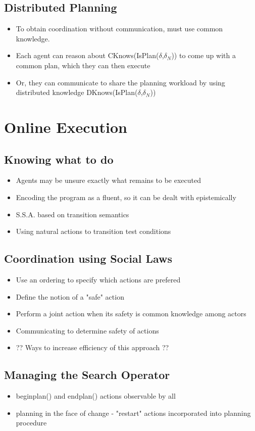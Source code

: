 \section{Distributed Planning}
\begin{itemize}
\item To obtain coordination without communication, must use common knowledge.
\item Each agent can reason about CKnows(IsPlan($\delta$,$\delta_N$)) to come up with a common plan, which they can then execute
\item Or, they can communicate to share the planning workload by using distributed knowledge DKnows(IsPlan($\delta$,$\delta_N$))
\end{itemize}


\chapter{Online Execution}\label{ch:online-exec}

\section{Knowing what to do}
\begin{itemize}
\item Agents may be unsure exactly what remains to be executed
\item Encoding the program as a fluent, so it can be dealt with epistemically
\item S.S.A. based on transition semantics
\item Using natural actions to transition test conditions
\end{itemize}

\section{Coordination using Social Laws}
\begin{itemize}
\item Use an ordering to specify which actions are prefered
\item Define the notion of a "safe" action
\item Perform a joint action when its safety is common knowledge among actors
\item Communicating to determine safety of actions
\item ?? Ways to increase efficiency of this approach ??
\end{itemize}

\section{Managing the Search Operator}
\begin{itemize}
\item beginplan() and endplan() actions observable by all
\item planning in the face of change - "restart" actions incorporated into planning procedure
\end{itemize}

